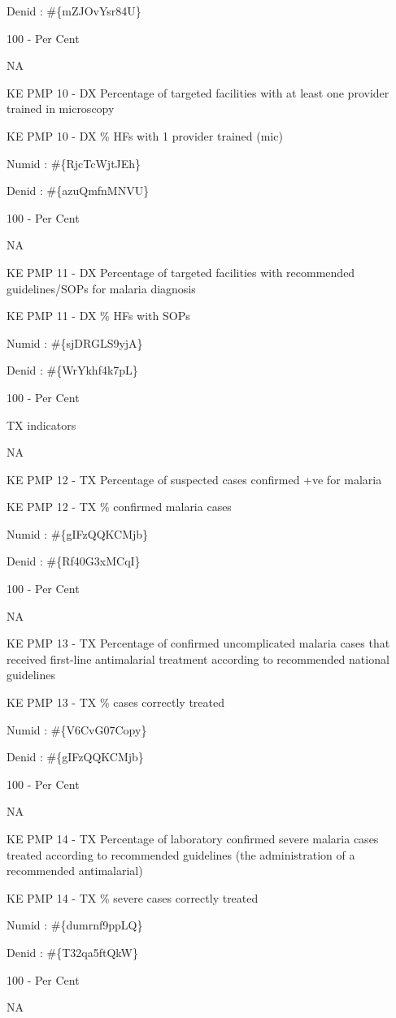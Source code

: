 \documentclass[]{book}
\begin{document}
Denid : \#\{mZJOvYsr84U\}

100 - Per Cent

NA

KE PMP 10 - DX Percentage of targeted facilities with at least one provider trained in microscopy

KE PMP 10 - DX \% HFs with 1 provider trained (mic)

Numid : \#\{RjcTcWjtJEh\}

Denid : \#\{azuQmfnMNVU\}

100 - Per Cent

NA

KE PMP 11 - DX Percentage of targeted facilities with recommended guidelines/SOPs for malaria diagnosis

KE PMP 11 - DX \% HFs with SOPs

Numid : \#\{sjDRGLS9yjA\}

Denid : \#\{WrYkhf4k7pL\}

100 - Per Cent

TX indicators

NA

KE PMP 12 - TX Percentage of suspected cases confirmed +ve for malaria

KE PMP 12 - TX \% confirmed malaria cases

Numid : \#\{gIFzQQKCMjb\}

Denid : \#\{Rf40G3xMCqI\}

100 - Per Cent

NA

KE PMP 13 - TX Percentage of confirmed uncomplicated malaria cases that received first-line antimalarial treatment according to recommended national guidelines

KE PMP 13 - TX \% cases correctly treated

Numid : \#\{V6CvG07Copy\}

Denid : \#\{gIFzQQKCMjb\}

100 - Per Cent

NA

KE PMP 14 - TX Percentage of laboratory confirmed severe malaria cases treated according to recommended guidelines (the administration of a recommended antimalarial)

KE PMP 14 - TX \% severe cases correctly treated

Numid : \#\{dumrnf9ppLQ\}

Denid : \#\{T32qa5ftQkW\}

100 - Per Cent

NA
\end{document}
